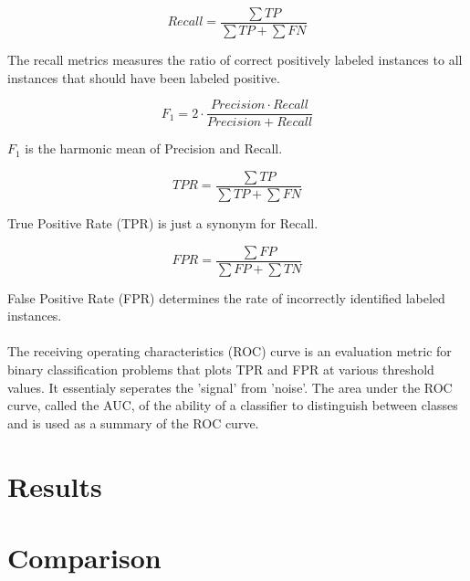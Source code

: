 $${
            Recall = \frac{\sum TP}{\sum TP + \sum FN}
        }
$$

The recall metrics measures the ratio of correct positively labeled instances to all instances that should have been labeled positive.

$${
            F_1 = 2 \cdot \frac{Precision \cdot Recall}{Precision + Recall}
        }
$$

$F_1$ is the harmonic mean of Precision and Recall.

$${
            TPR = \frac{\sum TP}{\sum TP + \sum FN}
        }
$$

True Positive Rate (TPR) is just a synonym for Recall.

$${
            FPR = \frac{\sum FP}{\sum FP + \sum TN}
        }
$$

False Positive Rate (FPR) determines the rate of incorrectly identified labeled instances.\\\\
The receiving operating characteristics (ROC) curve is an evaluation metric for binary classification problems that plots TPR and FPR at various threshold values. It essentialy seperates the 'signal' from 'noise'. The area under the ROC curve, called the AUC, of the ability of a classifier to distinguish between classes and is used as a summary of the ROC curve.
\section{Results}

\section{Comparison }